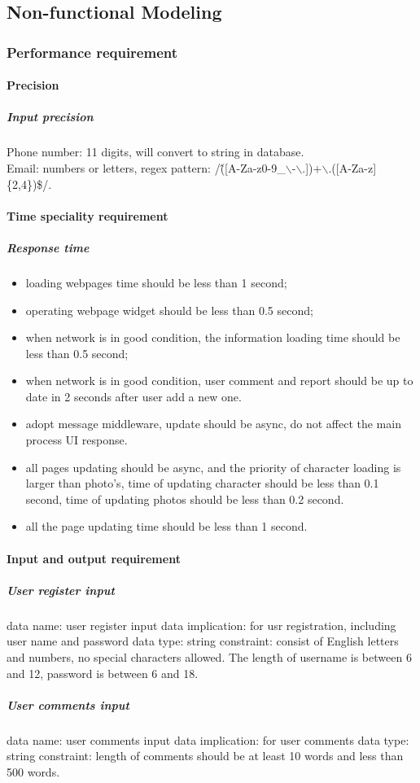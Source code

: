 \documentclass[16pt]{scrreprt}
\begin{document}
\subsection{Non-functional Modeling}
\subsubsection{Performance requirement}
\paragraph{Precision}
\subparagraph{Input precision}
Phone number: 11 digits, will convert to string in database. \\
Email: numbers or letters, regex pattern: /\^([A-Za-z0-9\_$\backslash$-$\backslash$.])+$\backslash$.([A-Za-z]\{2,4\})\$/. \\
\paragraph{Time speciality requirement}
\subparagraph{Response time}
\begin{itemize}
    \item loading webpages time should be less than 1 second;
    \item operating webpage widget should be less than 0.5 second;
    \item when network is in good condition, the information loading time should be less than 0.5 second;
    \item when network is in good condition, user comment and report should be up to date in 2 seconds after user add a new one.
    \item adopt message middleware, update should be async, do not affect the main process UI response.
    \item all pages updating should be async, and the priority of character loading is larger than photo's, time of updating character should be less than 0.1 second, time of updating photos should be less than 0.2 second.
    \item all the page updating time should be less than 1 second.
\end{itemize}
\paragraph{Input and output requirement}
\subparagraph{User register input}
data name: user register input data
implication: for usr registration, including user name and password
data type: string
constraint: consist of English letters and numbers, no special characters allowed. The length of username is between 6 and 12, password is between 6 and 18.
\subparagraph{User comments input}
data name: user comments input data
implication: for user comments 
data type: string
constraint: length of comments should be at least 10 words and less than 500 words.
\end{document}
